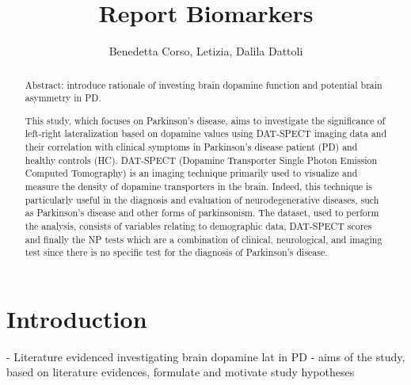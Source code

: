 \documentclass[]{article}
\title{Report Biomarkers}
\author{Benedetta Corso, Letizia, Dalila Dattoli}
\begin{document}
\maketitle

\begin{abstract}
Abstract: introduce rationale of investing brain dopamine function and potential brain asymmetry in PD.

This study, which focuses on Parkinson's disease, aims to investigate the significance of left-right lateralization based on dopamine values using DAT-SPECT imaging data and their correlation with clinical symptoms in Parkinson’s disease patient (PD) and healthy controls (HC). DAT-SPECT (Dopamine Transporter Single Photon Emission Computed Tomography) is an imaging technique primarily used to visualize and measure the density of dopamine transporters in the brain.  Indeed, this technique is particularly useful in the diagnosis and evaluation of neurodegenerative diseases, such as Parkinson's disease and other forms of parkinsonism. The dataset, used to perform the analysis, consists of variables relating to demographic data, DAT-SPECT scores and finally the NP tests which are a combination of clinical, neurological, and imaging test since there is no specific test for the diagnosis of Parkinson’s disease.

\end{abstract}

\section{Introduction}

- Literature evidenced investigating brain dopamine lat in PD
- aims of the study, based on literature evidences, 
formulate and motivate study hypotheses
\end{document}
